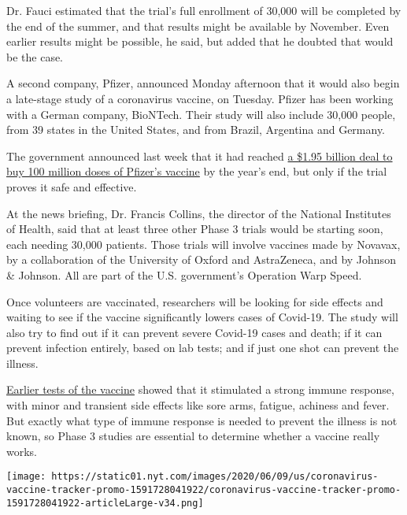 Dr. Fauci estimated that the trial's full enrollment of 30,000 will be
completed by the end of the summer, and that results might be available
by November. Even earlier results might be possible, he said, but added
that he doubted that would be the case.

A second company, Pfizer, announced Monday afternoon that it would also
begin a late-stage study of a coronavirus vaccine, on Tuesday. Pfizer
has been working with a German company, BioNTech. Their study will also
include 30,000 people, from 39 states in the United States, and from
Brazil, Argentina and Germany.

The government announced last week that it had reached
\href{https://www.nytimes.com/2020/07/22/us/politics/pfizer-coronavirus-vaccine.html}{a
\$1.95 billion deal to buy 100 million doses of Pfizer's vaccine} by the
year's end, but only if the trial proves it safe and effective.

At the news briefing, Dr. Francis Collins, the director of the National
Institutes of Health, said that at least three other Phase 3 trials
would be starting soon, each needing 30,000 patients. Those trials will
involve vaccines made by Novavax, by a collaboration of the University
of Oxford and AstraZeneca, and by Johnson \& Johnson. All are part of
the U.S. government's Operation Warp Speed.

Once volunteers are vaccinated, researchers will be looking for side
effects and waiting to see if the vaccine significantly lowers cases of
Covid-19. The study will also try to find out if it can prevent severe
Covid-19 cases and death; if it can prevent infection entirely, based on
lab tests; and if just one shot can prevent the illness.

\href{https://slack-redir.net/link?url=https\%3A\%2F\%2Fwww.nytimes.com\%2F2020\%2F07\%2F14\%2Fhealth\%2Fcornavirus-vaccine-moderna.html\%3FsearchResultPosition\%3D5}{Earlier
tests of the vaccine} showed that it stimulated a strong immune
response, with minor and transient side effects like sore arms, fatigue,
achiness and fever. But exactly what type of immune response is needed
to prevent the illness is not known, so Phase 3 studies are essential to
determine whether a vaccine really works.

\href{https://www.nytimes.com/interactive/2020/science/coronavirus-vaccine-tracker.html}{}

\texttt{[image: https://static01.nyt.com/images/2020/06/09/us/coronavirus-vaccine-tracker-promo-1591728041922/coronavirus-vaccine-tracker-promo-1591728041922-articleLarge-v34.png]}

